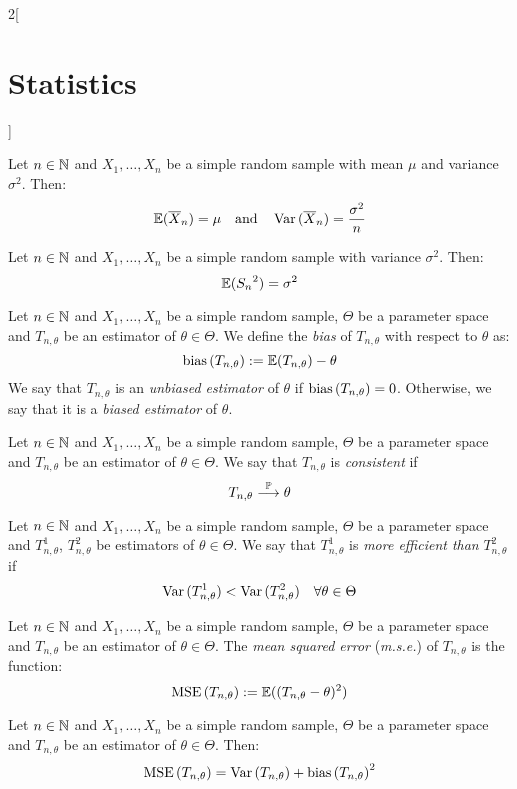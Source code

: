 \documentclass[../../../main.tex]{subfiles}
\begin{document}
\begin{multicols}{2}[\section{Statistics}]
\begin{definition}
  \end{definition}
  \begin{prop}
    Let $n\in\mathbb{N}$ and $X_1,\ldots,X_n$ be a simple random sample with mean $\mu$ and variance $\sigma^2$. Then: $$\mathbb{E}{(\overline{X}_n)}=\mu\quad\text{and}\quad\operatorname{Var}{(\overline{X}_n)}=\frac{\sigma^2}{n}$$
  \end{prop}
  \begin{prop}
    Let $n\in\mathbb{N}$ and $X_1,\ldots,X_n$ be a simple random sample with variance $\sigma^2$. Then: $$\mathbb{E}{({S_n}^2)}=\sigma^2$$
  \end{prop}
  \begin{definition}
    Let $n\in\mathbb{N}$ and $X_1,\ldots,X_n$ be a simple random sample, $\Theta$ be a parameter space and $T_{n,\theta}$ be an estimator of $\theta\in\Theta$. We define the \emph{bias} of $T_{n,\theta}$ with respect to $\theta$ as: $$\operatorname{bias}{(T_{n,\theta})}:=\mathbb{E}{(T_{n,\theta})}-\theta$$ We say that $T_{n,\theta}$ is an \emph{unbiased estimator} of $\theta$ if $\operatorname{bias}{(T_{n,\theta})}=0$. Otherwise, we say that it is a \emph{biased estimator} of $\theta$.
  \end{definition}
  \begin{definition}
    Let $n\in\mathbb{N}$ and $X_1,\ldots,X_n$ be a simple random sample, $\Theta$ be a parameter space and $T_{n,\theta}$ be an estimator of $\theta\in\Theta$. We say that $T_{n,\theta}$ is \emph{consistent} if $$T_{n,\theta}\overset{\mathbb{P}}{\longrightarrow}\theta$$
  \end{definition}
  \begin{definition}
    Let $n\in\mathbb{N}$ and $X_1,\ldots,X_n$ be a simple random sample, $\Theta$ be a parameter space and $T_{n,\theta}^1$, $T_{n,\theta}^2$ be estimators of $\theta\in\Theta$. We say that $T_{n,\theta}^1$ is \emph{more efficient than} $T_{n,\theta}^2$ if $$\operatorname{Var}{(T_{n,\theta}^1)}<\operatorname{Var}{(T_{n,\theta}^2)}\quad\forall\theta\in\Theta$$
  \end{definition}
  \begin{definition}
    Let $n\in\mathbb{N}$ and $X_1,\ldots,X_n$ be a simple random sample, $\Theta$ be a parameter space and $T_{n,\theta}$ be an estimator of $\theta\in\Theta$. The \emph{mean squared error} (\emph{m.s.e.}) of $T_{n,\theta}$ is the function: $$\operatorname{MSE}{(T_{n,\theta})}:=\mathbb{E}{((T_{n,\theta}-\theta)^2)}$$
  \end{definition}
  \begin{prop}
    Let $n\in\mathbb{N}$ and $X_1,\ldots,X_n$ be a simple random sample, $\Theta$ be a parameter space and $T_{n,\theta}$ be an estimator of $\theta\in\Theta$. Then: $$\operatorname{MSE}{(T_{n,\theta})}=\operatorname{Var}{(T_{n,\theta})}+{\operatorname{bias}{(T_{n,\theta})}}^2$$
  \end{prop}

\end{multicols}
\end{document}
